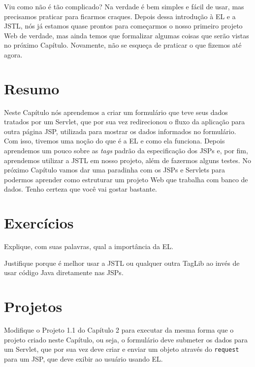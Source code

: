 Viu como não é tão complicado? Na verdade é bem simples e fácil de usar, mas precisamos praticar para ficarmos craques. Depois dessa introdução à EL e a JSTL, nós já estamos quase prontos para começarmos o nosso primeiro projeto Web de verdade, mas ainda temos que formalizar algumas coisas que serão vistas no próximo Capítulo. Novamente, não se esqueça de praticar o que fizemos até agora.  


\section{Resumo}

Neste Capítulo nós aprendemos a criar um formulário que teve seus dados tratados por um Servlet, que por sua vez redirecionou o fluxo da aplicação para outra página JSP, utilizada para mostrar os dados informados no formulário. Com isso, tivemos uma noção do que é a EL e como ela funciona. Depois aprendemos um pouco sobre as \textit{tags} padrão da especificação dos JSPs e, por fim, aprendemos utilizar a JSTL em nosso projeto, além de fazermos alguns testes. No próximo Capítulo vamos dar uma paradinha com os JSPs e Servlets para podermos aprender como estruturar um projeto Web que trabalha com banco de dados. Tenho certeza que você vai gostar bastante.


\section{Exercícios}

\begin{exercicioSemArquivo}{}{}{}
    Explique, com suas palavras, qual a importância da EL.
\end{exercicioSemArquivo}

\begin{exercicioSemArquivo}{}{}{}
    Justifique porque é melhor usar a JSTL ou qualquer outra TagLib ao invés de usar código Java diretamente nas JSPs.
\end{exercicioSemArquivo}

\section{Projetos}

\begin{projetoSemArquivo}{}{}{}
    Modifique o Projeto 1.1 do Capítulo 2 para executar da mesma forma que o projeto criado neste Capítulo, ou seja, o formulário deve submeter os dados para um Servlet, que por sua vez deve criar e enviar um objeto através do \texttt{request} para um JSP, que deve exibir ao usuário usando EL.
\end{projetoSemArquivo}

